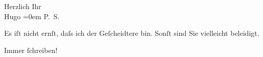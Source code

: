 \pstart
           Herzlich Ihr{\\[\baselineskip]}\spacefill\mbox{Hugo}\pend
           \leftskip=0em{}
\pstart
           \noindent{}\textsc{P. S.}\pend
           
\pstart
           Es iſt nicht ernſt, daſs ich der Geſcheidtere bin. Sonſt sind Sie vielleicht
                  beleidigt.\pend
           
\pstart
           \centering{}{\pb}Immer{ }ſchreiben!\pend
           \endnumbering{}  \newcommand{\dateiname}{L00949}\newcommand{\titel}{Hugo von Hofmannsthal an Arthur Schnitzler, 20. 7. [1899]}\newcommand{\editorInnen}{Martin Anton Müller und Gerd-Hermann Susen}
